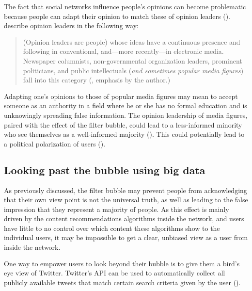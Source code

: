 The fact that social networks influence people's opinions can become problematic because people can adapt their opinion to match these of opinion leaders (\cite{altafiniDynamicsOpinionForming2012}). \citeauthor{gokceTwitterPoliticsIdentifying2014} describe opinion leaders in the following way:

\begin{quote}
    (Opinion leaders are people) whose ideas have a continuous presence and following in conventional, and—more recently—in electronic media. Newspaper columnists, non-governmental organization leaders, prominent politicians, and public intellectuals (\emph{and sometimes popular media ﬁgures}) fall into this category (\cite[673]{gokceTwitterPoliticsIdentifying2014}, emphasis by the author.)
\end{quote}

Adapting one's opinions to those of popular media figures may mean to accept someone as an authority in a field where he or she has no formal education and is unknowingly spreading false information. The opinion leadership of media figures, paired with the effect of the filter bubble, could lead to a less-informed minority who see themselves as a well-informed majority (\cite{moscoviciSilentMajoritiesLoud1991}). This could potentially lead to a political polarization of users (\cite{kobayashiDepolarizationSocialMedia2020}).


\subsection{Looking past the bubble using big data}
As previously discussed, the filter bubble may prevent people from acknowledging that their own view point is not the universal truth, as well as leading to the false impression that they represent a majority of people. As this effect is mainly driven by the content recommendations algorithms inside the network, and users have little to no control over which content these algorithms show to the individual users, it may be impossible to get a clear, unbiased view as a user from inside the network.

One way to empower users to look beyond their bubble is to give them a bird's eye view of Twitter. Twitter's API can be used to automatically collect all publicly available tweets that match certain search criteria given by the user (\cite{twitterinc.TwitterAPIs}).

